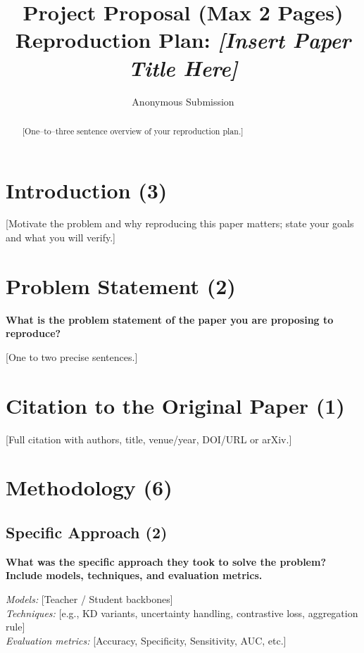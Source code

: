 \documentclass[letterpaper]{article} %
\title{Project Proposal (Max 2 Pages)\\
Reproduction Plan: \emph{[Insert Paper Title Here]}}
\author{Anonymous Submission}
\begin{document}
\maketitle

\begin{abstract}
[One–to–three sentence overview of your reproduction plan.]
\end{abstract}

\section{Introduction (3)}
[Motivate the problem and why reproducing this paper matters; state your goals and what you will verify.]


\section{Problem Statement (2)}
\textbf{What is the problem statement of the paper you are proposing to reproduce?}

[One to two precise sentences.]


\section{Citation to the Original Paper (1)}
[Full citation with authors, title, venue/year, DOI/URL or arXiv.]

\section{Methodology (6)}

\subsection{Specific Approach (2)}
\textbf{What was the specific approach they took to solve the problem? Include models, techniques, and evaluation metrics.}

\textit{Models:} [Teacher / Student backbones] \\
\textit{Techniques:} [e.g., KD variants, uncertainty handling, contrastive loss, aggregation rule] \\
\textit{Evaluation metrics:} [Accuracy, Specificity, Sensitivity, AUC, etc.]
\end{document}
